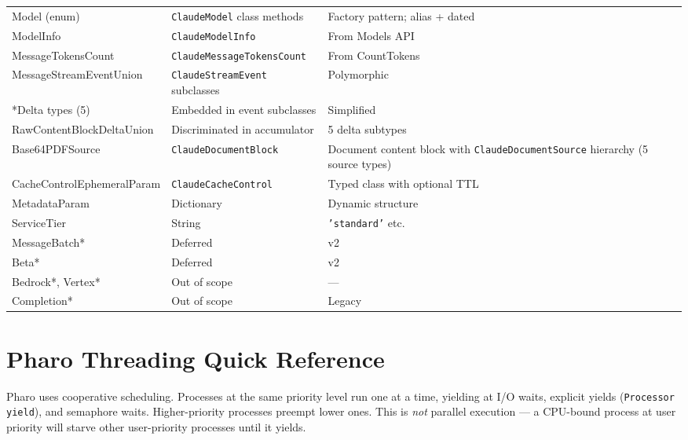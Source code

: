 \documentclass[a4paper,10pt,fleqn]{article}
\newcommand{\cls}[1]{\texttt{#1}}
\begin{document}
\begin{center}
\begin{longtable}{@{}llp{4.5cm}@{}}
Model (enum)               & \cls{ClaudeModel} class methods & Factory
  pattern; alias + dated \\
ModelInfo                  & \cls{ClaudeModelInfo}      & From Models API \\
MessageTokensCount         & \cls{ClaudeMessageTokensCount} & From CountTokens \\
MessageStreamEventUnion    & \cls{ClaudeStreamEvent} subclasses & Polymorphic \\
*Delta types (5)           & Embedded in event subclasses & Simplified \\
RawContentBlockDeltaUnion  & Discriminated in accumulator & 5 delta subtypes \\
Base64PDFSource            & \cls{ClaudeDocumentBlock}       & Document content block
  with \cls{ClaudeDocumentSource} hierarchy (5 source types) \\
CacheControlEphemeralParam & \cls{ClaudeCacheControl}   & Typed class with optional TTL \\
MetadataParam              & Dictionary                 & Dynamic structure \\
ServiceTier                & String                     & \texttt{'standard'} etc. \\
MessageBatch*              & Deferred                   & v2 \\
Beta*                      & Deferred                   & v2 \\
Bedrock*, Vertex*          & Out of scope               & --- \\
Completion*                & Out of scope               & Legacy \\
\bottomrule
\end{longtable}
\normalsize
\end{center}

\section{Pharo Threading Quick Reference}

Pharo uses cooperative scheduling.  Processes at the same priority level
run one at a time, yielding at I/O waits, explicit yields (\texttt{Processor
yield}), and semaphore waits.  Higher-priority processes preempt lower ones.
This is \emph{not} parallel execution --- a CPU-bound process at user
priority will starve other user-priority processes until it yields.
\end{document}
